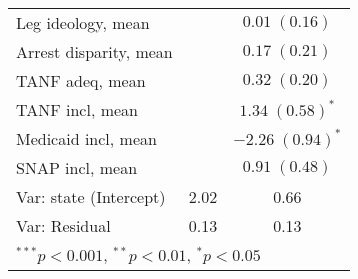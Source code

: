\begin{table}
\begin{center}
\begin{tabular}{l c c }
Leg ideology, mean         &                         & $0.01 \; (0.16)$        \\
Arrest disparity, mean     &                         & $0.17 \; (0.21)$        \\
TANF adeq, mean            &                         & $0.32 \; (0.20)$        \\
TANF incl, mean            &                         & $1.34 \; (0.58)^{*}$    \\
Medicaid incl, mean        &                         & $-2.26 \; (0.94)^{*}$   \\
SNAP incl, mean            &                         & $0.91 \; (0.48)$        \\
\hline
Var: state (Intercept)     & 2.02                    & 0.66                    \\
Var: Residual              & 0.13                    & 0.13                    \\
\hline
\multicolumn{3}{l}{\scriptsize{$^{***}p<0.001$, $^{**}p<0.01$, $^*p<0.05$}}
\end{tabular}
\label{table:coefficients}
\end{center}
\end{table}
